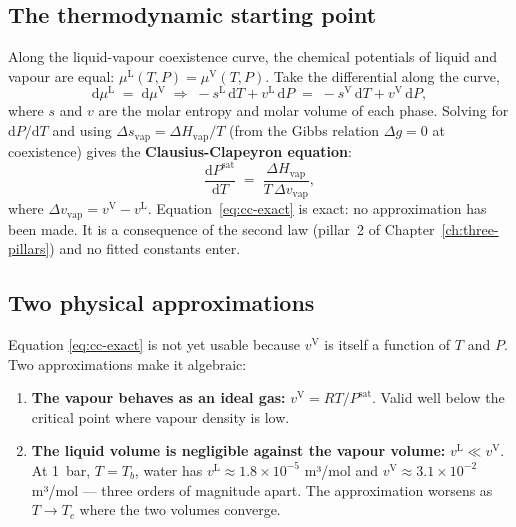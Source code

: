 \documentclass[11pt,a4paper]{article}
\newcommand{\Hvap}{\Delta H_{\!\mathrm{vap}}}
\begin{document}
\subsection{The thermodynamic starting point}

Along the liquid-vapour coexistence curve, the chemical potentials
of liquid and vapour are equal: $\mu^{\mathrm{L}}(T,P) =
\mu^{\mathrm{V}}(T,P)$.  Take the differential along the curve,
\[
   \mathrm{d}\mu^{\mathrm{L}} \;=\; \mathrm{d}\mu^{\mathrm{V}}
   \;\Longrightarrow\;
   -s^{\mathrm{L}}\,\mathrm{d}T + v^{\mathrm{L}}\,\mathrm{d}P
   \;=\;
   -s^{\mathrm{V}}\,\mathrm{d}T + v^{\mathrm{V}}\,\mathrm{d}P,
\]
where $s$ and $v$ are the molar entropy and molar volume of each
phase.  Solving for $\mathrm{d}P / \mathrm{d}T$ and using
$\Delta s_{\mathrm{vap}} = \Hvap / T$ (from the Gibbs relation
$\Delta g = 0$ at coexistence) gives the
\textbf{Clausius-Clapeyron equation}:
\begin{equation}
   \boxed{\;
   \frac{\mathrm{d}P^{\mathrm{sat}}}{\mathrm{d}T}
   \;=\; \frac{\Hvap}{T\,\Delta v_{\mathrm{vap}}},
   \;}
   \label{eq:cc-exact}
\end{equation}
where $\Delta v_{\mathrm{vap}} = v^{\mathrm{V}} - v^{\mathrm{L}}$.
Equation~\eqref{eq:cc-exact} is exact: no approximation has been
made.  It is a consequence of the second law (pillar~2 of
Chapter~\ref{ch:three-pillars}) and no fitted constants enter.

\subsection{Two physical approximations}

Equation \eqref{eq:cc-exact} is not yet usable because $v^{\mathrm{V}}$
is itself a function of $T$ and $P$.  Two approximations make it
algebraic:

\begin{enumerate}[leftmargin=*,nosep]
  \item \textbf{The vapour behaves as an ideal gas:}
        $v^{\mathrm{V}} = RT / P^{\mathrm{sat}}$.  Valid well below
        the critical point where vapour density is low.
  \item \textbf{The liquid volume is negligible against the vapour
        volume:} $v^{\mathrm{L}} \ll v^{\mathrm{V}}$.  At 1~bar, $T
        = T_b$, water has $v^{\mathrm{L}} \approx 1.8 \times 10^{-5}$
        m³/mol and $v^{\mathrm{V}} \approx 3.1 \times 10^{-2}$
        m³/mol --- three orders of magnitude apart.  The
        approximation worsens as $T \to T_c$ where the two volumes
        converge.
\end{enumerate}
\end{document}
